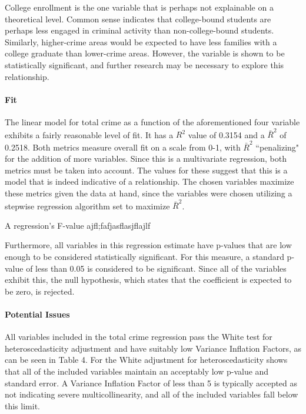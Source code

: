 \documentclass[12pt]{article}
\begin{document}
	\par
	
	College enrollment is the one variable that is perhaps not explainable on a theoretical level.  Common sense indicates that college-bound students are perhaps less engaged in criminal activity than non-college-bound students.  Similarly, higher-crime areas would be expected to have less families with a college graduate than lower-crime areas.  However, the variable is shown to be statistically significant, and further research may be necessary to explore this relationship.
	
	\paragraph{Fit}

	The linear model for total crime as a function of the aforementioned four variable exhibits a fairly reasonable level of fit.  It has a $ R^{2} $ value of 0.3154 and a $ \bar{R}^{2} $ of 0.2518.  Both metrics measure overall fit on a scale from 0-1, with $ \bar{R}^{2} $ ``penalizing" for the addition of more variables.  Since this is a multivariate regression, both metrics must be taken into account.  The values for these suggest that this is a model that is indeed indicative of a relationship.  The chosen variables maximize these metrics given the data at hand, since the variables were chosen utilizing a stepwise regression algorithm set to maximize $ \bar{R}^{2} $.
	\par
	
	A regression's F-value ajfl;fafjasflasjflajlf
	
	\par
	
	Furthermore, all variables in this regression estimate have p-values that are low enough to be considered statistically significant.  For this measure, a standard p-value of less than 0.05 is considered to be significant.  Since all of the variables exhibit this, the null hypothesis, which states that the coefficient is expected to be zero, is rejected.

	\paragraph{Potential Issues}All variables included in the total crime regression pass the White test for heteroscedasticity adjustment and have suitably low Variance Inflation Factors, as can be seen in Table 4.  For the White adjustment for heteroscedasticity shows that all of the included variables maintain an acceptably low p-value and standard error.  A Variance Inflation Factor of less than 5 is typically accepted as not indicating severe multicollinearity, and all of the included variables fall below this limit.
\end{document}
